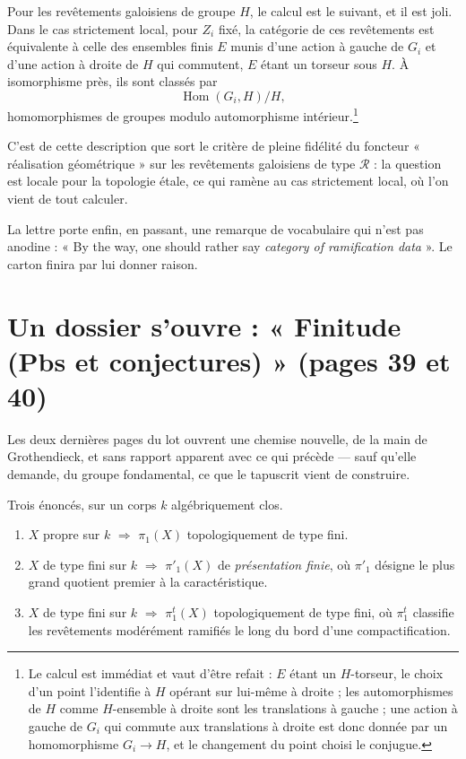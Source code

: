 \documentclass[11pt,a4paper]{article}
\begin{document}
Pour les revêtements galoisiens de groupe $H$, le calcul est le suivant, et il
est joli. Dans le cas strictement local, pour $Z_{i}$ fixé, la catégorie de
ces revêtements est équivalente à celle des ensembles finis $E$ munis d'une
action à gauche de $G_{i}$ et d'une action à droite de $H$ qui commutent, $E$
étant un torseur sous $H$. À isomorphisme près, ils sont classés par
\[
  \operatorname{Hom}(G_{i}, H) \big/ H ,
\]
homomorphismes de groupes modulo automorphisme intérieur.\footnote{Le calcul
est immédiat et vaut d'être refait : $E$ étant un $H$-torseur, le choix d'un
point l'identifie à $H$ opérant sur lui-même à droite ; les automorphismes de
$H$ comme $H$-ensemble à droite sont les translations à gauche ; une action à
gauche de $G_{i}$ qui commute aux translations à droite est donc donnée par un
homomorphisme $G_{i} \to H$, et le changement du point choisi le conjugue.}

C'est de cette description que sort le critère de pleine fidélité du foncteur
« réalisation géométrique » sur les revêtements galoisiens de type
$\mathcal{R}$ : la question est locale pour la topologie étale, ce qui ramène
au cas strictement local, où l'on vient de tout calculer.

La lettre porte enfin, en passant, une remarque de vocabulaire qui n'est pas
anodine : « By the way, one should rather say \emph{category of ramification
data} ». Le carton finira par lui donner raison.

\section*{Un dossier s'ouvre : « Finitude (Pbs et conjectures) » (pages 39 et 40)}

Les deux dernières pages du lot ouvrent une chemise nouvelle, de la main de
Grothendieck, et sans rapport apparent avec ce qui précède --- sauf qu'elle
demande, du groupe fondamental, ce que le tapuscrit vient de construire.

Trois énoncés, sur un corps $k$ algébriquement clos.

\begin{enumerate}
  \item[a)] $X$ propre sur $k$ $\Longrightarrow$ $\pi_{1}(X)$ topologiquement
    de type fini.
  \item[b)] $X$ de type fini sur $k$ $\Longrightarrow$ $\pi'_{1}(X)$ de
    \emph{présentation finie}, où $\pi'_{1}$ désigne le plus grand quotient
    premier à la caractéristique.
  \item[c)] $X$ de type fini sur $k$ $\Longrightarrow$ $\pi^{t}_{1}(X)$
    topologiquement de type fini, où $\pi^{t}_{1}$ classifie les revêtements
    modérément ramifiés le long du bord d'une compactification.
\end{enumerate}
\end{document}
